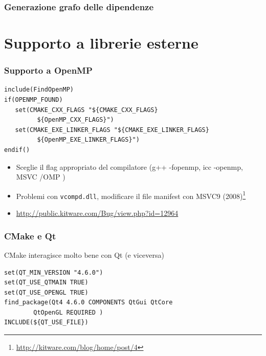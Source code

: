 \documentclass[10pt] {beamer}
\begin{document}
\begin{frame}
 \frametitle{Generazione grafo delle dipendenze}

\end{frame}



\section{Supporto a librerie esterne}
\begin{frame}[fragile]
 \frametitle{Supporto a OpenMP}
\begin{footnotesize}
\begin{verbatim}
include(FindOpenMP)
if(OPENMP_FOUND)
   set(CMAKE_CXX_FLAGS "${CMAKE_CXX_FLAGS} 
         ${OpenMP_CXX_FLAGS}")
   set(CMAKE_EXE_LINKER_FLAGS "${CMAKE_EXE_LINKER_FLAGS} 
         ${OpenMP_EXE_LINKER_FLAGS}")
endif()
\end{verbatim}
\end{footnotesize}
\begin{itemize}
 \item Sceglie il flag appropriato del compilatore (g++ -fopenmp, icc -openmp, MSVC /OMP )
 \item Problemi con \texttt{vcompd.dll}, modificare il file manifest con MSVC9 (2008)\footnote{\url{http://kitware.com/blog/home/post/4}}
\item \url{http://public.kitware.com/Bug/view.php?id=12964}
\end{itemize}

\end{frame}


\begin{frame}[fragile]
\frametitle{CMake e Qt}
CMake interagisce molto bene con Qt (e viceversa)
\begin{footnotesize}
\begin{verbatim}
set(QT_MIN_VERSION "4.6.0")
set(QT_USE_QTMAIN TRUE)
set(QT_USE_OPENGL TRUE)
find_package(Qt4 4.6.0 COMPONENTS QtGui QtCore 
	    QtOpenGL REQUIRED )
INCLUDE(${QT_USE_FILE})
\end{verbatim}
\end{footnotesize}
\end{frame}

\end{document}

